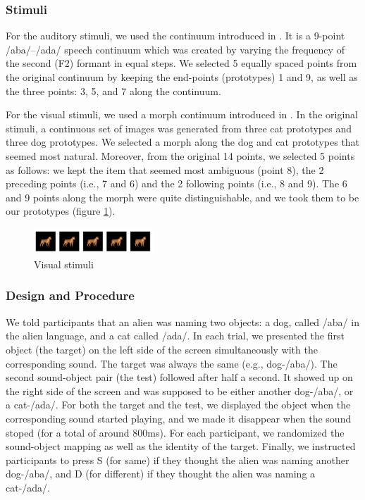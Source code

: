 \documentclass[10pt,letterpaper]{article}
\begin{document}
\subsubsection{Stimuli}
For the auditory stimuli, we used the continuum introduced in . It is a 9-point /aba/--/ada/ speech continuum which was created by varying the frequency of the second (F2) formant in equal steps. We selected 5 equally spaced points from the original continuum by keeping the end-points (prototypes) 1 and 9, as well as the three points: 3, 5, and 7 along the continuum.

For the visual stimuli, we used a morph continuum introduced in . In the original stimuli, a continuous set of images was generated from three cat prototypes and
three dog prototypes. We selected a morph along the dog and cat prototypes that seemed most natural. Moreover, from the original 14 points, we selected 5 points as follows: we kept the item that seemed most ambiguous (point 8), the 2 preceding points (i.e., 7 and 6) and the 2 following points (i.e., 8 and 9). The 6 and 9 points along the morph were quite distinguishable, and we took them to be our prototypes (figure \ref{fig:morph}).

\begin{figure}[tp]
\centering
\includegraphics[width=0.4\textwidth]{morph.png}
\caption{Visual stimuli}
\label{fig:morph}
\end{figure}


\subsubsection{Design and Procedure}
We told participants that an alien was naming two objects: a dog, called /aba/ in the alien language, and a cat called /ada/. In each trial, we presented the first object (the target) on the left side of the screen simultaneously with the corresponding sound. The target was always the same (e.g., dog-/aba/). The second sound-object pair (the test) followed after half a second. It showed up on the right side of the screen and was supposed to be either another dog-/aba/, or a cat-/ada/. For both the target and the test, we displayed the object when the corresponding sound started playing, and we made it disappear when the sound stoped (for a total of around 800ms). For each participant, we randomized the sound-object mapping as well as the identity of the target. Finally, we instructed participants to press S (for same) if they thought the alien was naming another dog-/aba/, and D (for different) if they thought the alien was naming a cat-/ada/. 
\end{document}
